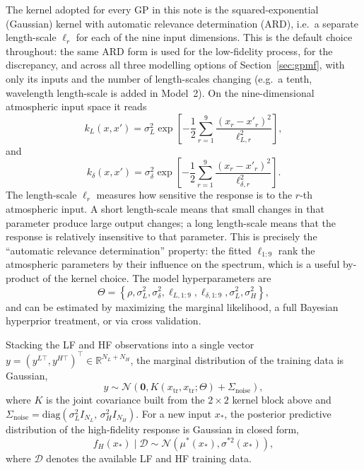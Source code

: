 \documentclass[11pt,a4paper]{article}
\begin{document}
The kernel adopted for every GP in this note is the squared-exponential
(Gaussian) kernel with automatic relevance determination (ARD), i.e.\ a
separate length-scale $\ell_r$ for each of the nine input dimensions. This is
the default choice throughout: the same ARD form is used for the low-fidelity
process, for the discrepancy, and across all three modelling options of
Section~\ref{sec:gpmf}, with only its inputs and the number of length-scales
changing (e.g.\ a tenth, wavelength length-scale is added in Model~2). On the
nine-dimensional atmospheric input space it reads
\[
    k_{L}(x,x')
    =
    \sigma^{2}_{L}
    \exp
    \left[
    -\frac{1}{2}
    \sum_{r=1}^{9}
    \frac{(x_{r}-x'_{r})^{2}}{\ell^{2}_{L,r}}
    \right],
\]
and
\[
    k_{\delta}(x,x')
    =
    \sigma^{2}_{\delta}
    \exp
    \left[
    -\frac{1}{2}
    \sum_{r=1}^{9}
    \frac{(x_{r}-x'_{r})^{2}}{\ell^{2}_{\delta,r}}
    \right].
\]
The length-scale \(\ell_{r}\) measures how sensitive the response is to
the \(r\)-th atmospheric input. A short length-scale means that small
changes in that parameter produce large output changes; a long
length-scale means that the response is relatively insensitive to that
parameter. This is precisely the ``automatic relevance determination''
property: the fitted $\ell_{1:9}$ rank the atmospheric parameters by their
influence on the spectrum, which is a useful by-product of the kernel choice.
The model hyperparameters are
\[
    \Theta
    =
    \left\{
    \rho,
    \sigma^{2}_{L},
    \sigma^{2}_{\delta},
    \ell_{L,1:9},
    \ell_{\delta,1:9},
    \sigma^{2}_{L},
    \sigma^{2}_{H}
    \right\},
\]
and can be estimated by maximizing the marginal likelihood, a full Bayesian hyperprior treatment, or via cross validation.

Stacking the LF and HF observations into a single vector
\(y=(y^{L\top},y^{H\top})^{\top} \in \mathbb{R}^{N_{L}+N_{H}}\), the
marginal distribution of the training data is Gaussian,
\[
    y
    \sim
    \mathcal{N}
    \left(
    \mathbf{0},
    K\!\left(x_{\mathrm{tr}}, x_{\mathrm{tr}};\Theta\right)
    +
    \Sigma_{\mathrm{noise}}
    \right),
\]
where \(K\) is the joint covariance built from the \(2\times 2\) kernel
block above and
\(\Sigma_{\mathrm{noise}}
=\mathrm{diag}\!\left(\sigma_{L}^{2}I_{N_{L}},\,
\sigma_{H}^{2}I_{N_{H}}\right)\).
For a new input \(x_{\ast}\), the posterior predictive distribution of
the high-fidelity response is Gaussian in closed form,
\[
    f_{H}(x_{\ast})\mid \mathcal{D}
    \sim
    \mathcal{N}
    \left(
    \mu^{\ast}(x_{\ast}),
    \sigma^{\ast 2}(x_{\ast})
    \right),
\]
where \(\mathcal{D}\) denotes the available LF and HF training data.
\end{document}

